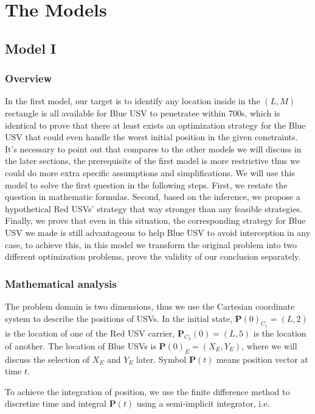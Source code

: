 \documentclass{mcmthesis}
\begin{document}
\section{The Models}

\subsection{Model I}

\subsubsection{Overview}
In the first model, our target is to identify any location inside in the $(L, M)$ rectangle is all available for Blue USV to penetratee within 700s, which is identical to prove that there at least exists an optimization strategy for the Blue USV that could even handle the worst initial position in the given constraints. It's necessary to point out that compares to the other models we will discuss in the later sections, the prerequisite of the first model is more restrictive thus we could do more extra specific assumptions and simplifications. We will use this model to solve the first question in the following steps. First, we restate the question in mathematic formulas. Second, based on the inference, we propose a hypothetical Red USVs' strategy that way stronger than any feasible strategies. Finally, we prove that even in this situation, the corresponding strategy for Blue USV we made is still advantageous to help Blue USV to avoid interception in any case, to achieve this, in this model we transform the original problem into two different optimization problems, prove the validity of our conclusion separately.

\subsubsection{Mathematical analysis}
The problem domain is two dimensions, thus we use the Cartesian coordinate system to describe the positions of USVs. In the initial state, $\mathbf{P}(0)_{C_1}=(L, 2)$ is the location of one of the Red USV carrier, $\mathbf{P}_{C_2}(0)=(L, 5)$ is the location of another. The location of Blue USVs is $\mathbf{P}(0)_{E}=(X_E, Y_E)$, where we will discuss the selection of $X_E$ and $Y_E$ later. Symbol $\mathbf{P}(t)$ means position vector at time $t$. \par
To achieve the integration of position, we use the finite difference method to discretize time and integral $\mathbf{P}(t)$ using a semi-implicit integrator, i.e.
\end{document}
